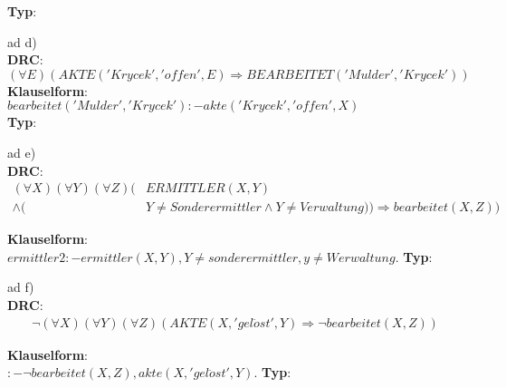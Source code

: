 \documentclass[12pt,a4paper]{amsart}
\begin{document}
\textbf{Typ}:\\

\medskip


ad d) \\

\textbf{DRC}:\\
$(\forall E)(AKTE('Krycek', 'offen', E) \Rightarrow BEARBEITET('Mulder', 'Krycek'))$ \\
\textbf{Klauselform}:\\
$bearbeitet('Mulder', 'Krycek') :- akte('Krycek', 'offen', X)$\\
\textbf{Typ}:\\
	
\medskip


ad e) \\

\textbf{DRC}:\\
\begin{equation}
\begin{split}
(\forall X)(\forall Y)(\forall Z)(&ERMITTLER(X, Y) \\
\wedge (&Y \neq Sonderermittler \wedge Y \neq Verwaltung)) \Rightarrow bearbeitet(X,Z))
\end{split}
\end{equation}

\textbf{Klauselform}:\\
$ermittler2 :- ermittler(X,Y), Y \neq sonderermittler, y \neq Werwaltung.$
\textbf{Typ}:\\

\medskip

ad f) \\

\textbf{DRC}:\\
\begin{equation}
\begin{split}
\lnot (\forall X)(\forall Y)(\forall Z)(AKTE(X, 'gel\ddot{o}st', Y) \Rightarrow \lnot bearbeitet(X, Z))
\end{split}
\end{equation}

\textbf{Klauselform}:\\
$:- \lnot bearbeitet(X, Z), akte(X, 'gel\ddot{o}st', Y).$
\textbf{Typ}:\\
\end{document}
